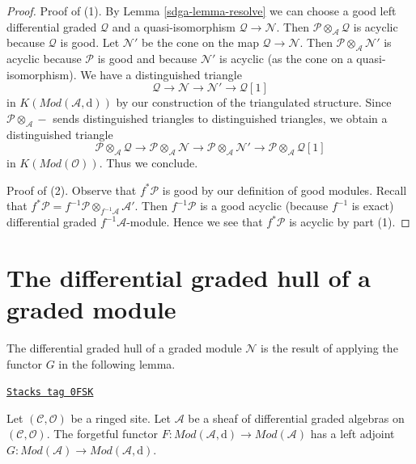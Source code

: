 \begin{proof}

Proof of (1). By Lemma \ref{sdga-lemma-resolve} we can choose a good
left differential graded $\mathcal{Q}$ and a quasi-isomorphism
$\mathcal{Q} \to \mathcal{N}$. Then
$\mathcal{P} \otimes_\mathcal{A} \mathcal{Q}$
is acyclic because $\mathcal{Q}$ is good.
Let $\mathcal{N}'$ be the cone on the map
$\mathcal{Q} \to \mathcal{N}$. Then
$\mathcal{P} \otimes_\mathcal{A} \mathcal{N}'$ is acyclic because
$\mathcal{P}$ is good and because $\mathcal{N}'$ is acyclic
(as the cone on a quasi-isomorphism). We have a distinguished
triangle
$$
\mathcal{Q} \to \mathcal{N} \to \mathcal{N}' \to \mathcal{Q}[1]
$$
in $K(\textit{Mod}(\mathcal{A}, \text{d}))$ by our construction
of the triangulated structure. Since
$\mathcal{P} \otimes_\mathcal{A} -$ sends distinguished
triangles to distinguished triangles, we obtain a distinguished
triangle
$$
\mathcal{P} \otimes_\mathcal{A} \mathcal{Q} \to
\mathcal{P} \otimes_\mathcal{A} \mathcal{N} \to
\mathcal{P} \otimes_\mathcal{A} \mathcal{N}' \to
\mathcal{P} \otimes_\mathcal{A} \mathcal{Q}[1]
$$
in $K(\textit{Mod}(\mathcal{O}))$. Thus we conclude.

\medskip\noindent
Proof of (2). Observe that $f^*\mathcal{P}$ is good by our definition
of good modules. Recall that
$f^*\mathcal{P} = f^{-1}\mathcal{P} \otimes_{f^{-1}\mathcal{A}} \mathcal{A}'$.
Then $f^{-1}\mathcal{P}$ is a good acyclic (because $f^{-1}$ is exact)
differential graded $f^{-1}\mathcal{A}$-module. Hence
we see that $f^*\mathcal{P}$ is acyclic by part (1).
\end{proof}

\section{The differential graded hull of a graded module}
\label{sdga-section-dg-hull}
The differential graded hull of a graded module $\mathcal{N}$ is
the result of applying the functor $G$ in the following lemma.

\begin{lemma}[Dg hull]
\label{sdga-lemma-dg-hull}
\href{https://stacks.math.columbia.edu/tag/0FSK}{\texttt{Stacks tag 0FSK}}

Let $(\mathcal{C}, \mathcal{O})$ be a ringed site.
Let $\mathcal{A}$ be a sheaf of differential graded algebras
on $(\mathcal{C}, \mathcal{O})$. The forgetful functor
$F : \textit{Mod}(\mathcal{A}, \text{d}) \to \textit{Mod}(\mathcal{A})$
has a left adjoint $G : \textit{Mod}(\mathcal{A}) \to
\textit{Mod}(\mathcal{A}, \text{d})$.
\end{lemma}

